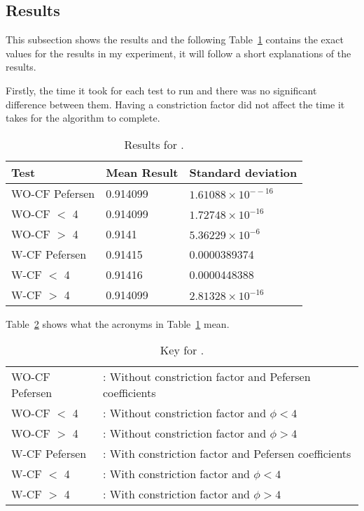     \subsection{Results} %
    \label{sub:results}
      This subsection shows the results and the following Table~\ref{table:constriction_factor_results} contains the exact values for the results in my experiment, it will follow a short explanations of the results. 

      Firstly, the time it took for each test to run and there was no significant difference between them. Having a constriction factor did not affect the time it takes for the algorithm to complete. 

        \begin{table}[H]
          \setlength{\extrarowheight}{2.0pt}
          \begin{tabular}{|l|l|l|}
            \hline
            Test & Mean Result & Standard deviation \\
            \hline
            WO-CF Pefersen & 0.914099 & $1.61088\times10^{--16}$ \\
            \hline
            WO-CF $<$ 4 & 0.914099 & $1.72748\times10^{-16}$ \\
            \hline
            WO-CF $>$ 4 & 0.9141 & $5.36229\times10^{-6}$ \\
            \hline
            W-CF Pefersen & 0.91415 & 0.0000389374 \\
            \hline
            W-CF $<$ 4 & 0.91416 & 0.0000448388 \\
            \hline
            W-CF $>$ 4 & 0.914099 & $2.81328\times10^{-16}$ \\
            \hline
          \end{tabular}
          \caption{Results for .}
          \label{table:constriction_factor_results}
        \end{table}

      Table~\ref{table:key_constriction_factor_results} shows what the acronyms in Table~\ref{table:constriction_factor_results} mean. 

        \begin{table}[H]
          \setlength{\extrarowheight}{2.0pt}
          \begin{tabular}{ l l }
            WO-CF Pefersen & : Without constriction factor and Pefersen coefficients  \\
            WO-CF $<$ 4 & : Without constriction factor and $\phi < 4$ \\
            WO-CF $>$ 4 & : Without constriction factor and $\phi > 4$ \\
            W-CF Pefersen & : With constriction factor and Pefersen coefficients  \\
            W-CF $<$ 4 & : With constriction factor and $\phi < 4$ \\
            W-CF $>$ 4 & : With constriction factor and $\phi > 4$ \\
          \end{tabular}
          \caption{Key for .}
          \label{table:key_constriction_factor_results}
        \end{table}

